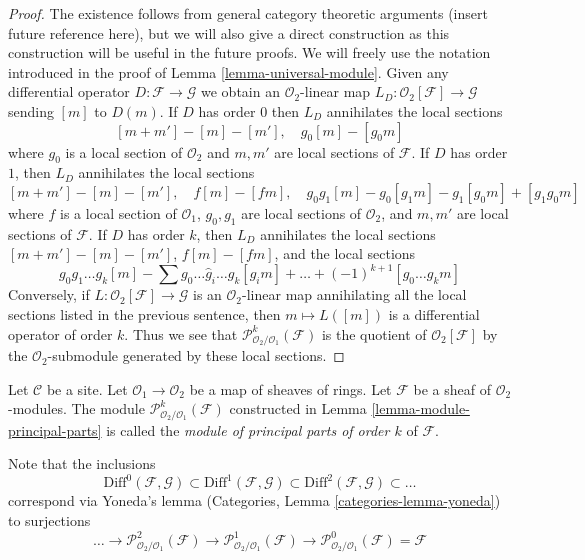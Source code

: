 \begin{proof}
The existence follows from general category theoretic arguments
(insert future reference here), but we will also give a direct
construction as this construction will be useful in the future proofs.
We will freely use the notation introduced in the proof of
Lemma \ref{lemma-universal-module}.
Given any differential operator $D : \mathcal{F} \to \mathcal{G}$
we obtain an $\mathcal{O}_2$-linear map
$L_D : \mathcal{O}_2[\mathcal{F}] \to \mathcal{G}$
sending $[m]$ to $D(m)$. If $D$ has order $0$
then $L_D$ annihilates the local sections
$$
[m + m'] - [m] - [m'],\quad
g_0[m] - [g_0m]
$$
where $g_0$ is a local section of $\mathcal{O}_2$ and $m, m'$
are local sections of $\mathcal{F}$. If $D$ has order $1$, then $L_D$
annihilates the local sections
$$
[m + m'] - [m] - [m'],\quad
f[m] - [fm], \quad
g_0g_1[m] - g_0[g_1m] - g_1[g_0m] + [g_1g_0m]
$$
where $f$ is a local section of $\mathcal{O}_1$,
$g_0, g_1$ are local sections of $\mathcal{O}_2$, and
$m, m'$ are local sections of $\mathcal{F}$.
If $D$ has order $k$, then $L_D$ annihilates the local sections
$[m + m'] - [m] - [m']$, $f[m] - [fm]$, and the local sections
$$
g_0g_1\ldots g_k[m] - \sum g_0 \ldots \hat g_i \ldots g_k[g_im] + \ldots
+(-1)^{k + 1}[g_0\ldots g_km]
$$
Conversely, if $L : \mathcal{O}_2[\mathcal{F}] \to \mathcal{G}$ is an
$\mathcal{O}_2$-linear map annihilating all the local sections
listed in the previous sentence, then $m \mapsto L([m])$ is a
differential operator of order $k$. Thus we see that
$\mathcal{P}^k_{\mathcal{O}_2/\mathcal{O}_1}(\mathcal{F})$
is the quotient of $\mathcal{O}_2[\mathcal{F}]$
by the $\mathcal{O}_2$-submodule generated by these local sections.
\end{proof}

\begin{definition}
\label{definition-module-principal-parts}
Let $\mathcal{C}$ be a site.
Let $\mathcal{O}_1 \to \mathcal{O}_2$ be a map of sheaves of rings.
Let $\mathcal{F}$ be a sheaf of $\mathcal{O}_2$-modules.
The module $\mathcal{P}^k_{\mathcal{O}_2/\mathcal{O}_1}(\mathcal{F})$
constructed in Lemma \ref{lemma-module-principal-parts}
is called the {\it module of principal parts of order $k$} of $\mathcal{F}$.
\end{definition}

\noindent
Note that the inclusions
$$
\text{Diff}^0(\mathcal{F}, \mathcal{G}) \subset
\text{Diff}^1(\mathcal{F}, \mathcal{G}) \subset
\text{Diff}^2(\mathcal{F}, \mathcal{G}) \subset \ldots
$$
correspond via Yoneda's lemma (Categories, Lemma \ref{categories-lemma-yoneda})
to surjections
$$
\ldots \to \mathcal{P}^2_{\mathcal{O}_2/\mathcal{O}_1}(\mathcal{F})
\to \mathcal{P}^1_{\mathcal{O}_2/\mathcal{O}_1}(\mathcal{F})
\to \mathcal{P}^0_{\mathcal{O}_2/\mathcal{O}_1}(\mathcal{F}) = \mathcal{F}
$$

